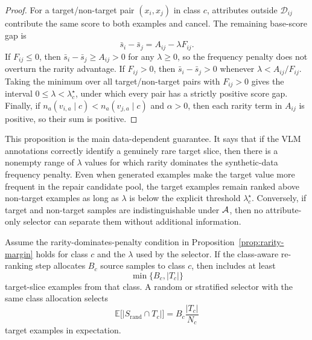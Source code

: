 \begin{tcolorbox}[
    colback=green!2!white,
    colframe=green!20!white,
    arc=3pt,
    boxrule=1pt,
    drop shadow,
    breakable
]
\begin{proof}
For a target/non-target pair $(x_i,x_j)$ in class $c$, attributes outside $\mathcal{D}_{ij}$ contribute the same score to both examples and cancel. The remaining base-score gap is
\begin{equation}
\label{eq:base-score-gap}
\bar{s}_i-\bar{s}_j
=
A_{ij}-\lambda F_{ij}.
\end{equation}
If $F_{ij}\leq 0$, then $\bar{s}_i-\bar{s}_j\geq A_{ij}>0$ for any $\lambda\geq 0$, so the frequency penalty does not overturn the rarity advantage. If $F_{ij}>0$, then $\bar{s}_i-\bar{s}_j>0$ whenever $\lambda<A_{ij}/F_{ij}$. Taking the minimum over all target/non-target pairs with $F_{ij}>0$ gives the interval $0\leq\lambda<\lambda_c^\star$, under which every pair has a strictly positive score gap. Finally, if $n_a(v_{i,a}\mid c)<n_a(v_{j,a}\mid c)$ and $\alpha>0$, then each rarity term in $A_{ij}$ is positive, so their sum is positive.
\end{proof}
\end{tcolorbox}

This proposition is the main data-dependent guarantee. It says that if the VLM annotations correctly identify a genuinely rare target slice, then there is a nonempty range of $\lambda$ values for which rarity dominates the synthetic-data frequency penalty. Even when generated examples make the target value more frequent in the repair candidate pool, the target examples remain ranked above non-target examples as long as $\lambda$ is below the explicit threshold $\lambda_c^\star$. Conversely, if target and non-target samples are indistinguishable under $\mathcal{A}$, then no attribute-only selector can separate them without additional information.

\begin{tcolorbox}[
    colback=blue!2!white,
    colframe=blue!20!white,
    arc=3pt,
    boxrule=1pt,
    drop shadow,
    breakable
]
\begin{proposition}
\label{prop:deterministic-enrichment}
Assume the rarity-dominates-penalty condition in Proposition~\ref{prop:rarity-margin} holds for class $c$ and the $\lambda$ used by the selector. If the class-aware re-ranking step allocates $B_c$ source samples to class $c$, then \model includes at least
\begin{equation}
\label{eq:deterministic-enrichment-bound}
\min\{B_c,|T_c|\}
\end{equation}
target-slice examples from that class. A random or stratified selector with the same class allocation selects
\begin{equation}
\label{eq:random-target-expectation}
\mathbb{E}\big[|S_{\mathrm{rand}}\cap T_c|\big]
=
B_c\frac{|T_c|}{N_c}
\end{equation}
target examples in expectation.
\end{proposition}
\end{tcolorbox}

